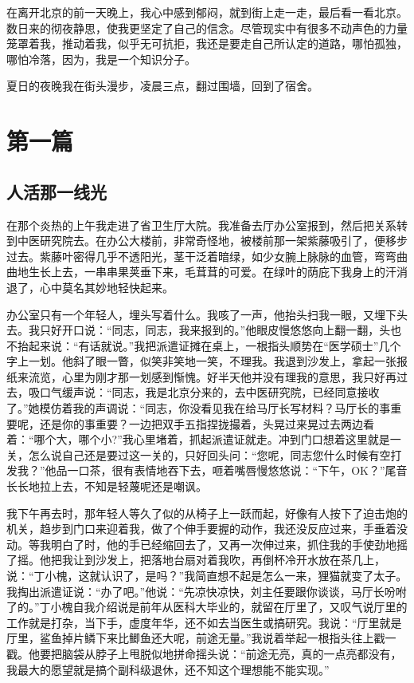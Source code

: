 \documentclass[12pt,oneside]{book}
\begin{document}
在离开北京的前一天晚上，我心中感到郁闷，就到街上走一走，最后看一看北京。数日来的彻夜静思，使我更坚定了自己的信念。尽管现实中有很多不动声色的力量笼罩着我，推动着我，似乎无可抗拒，我还是要走自己所认定的道路，哪怕孤独，哪怕冷落，因为，我是一个知识分子。

夏日的夜晚我在街头漫步，凌晨三点，翻过围墙，回到了宿舍。

\part{第一篇}
\chapter{人活那一线光}
在那个炎热的上午我走进了省卫生厅大院。我准备去厅办公室报到，然后把关系转到中医研究院去。在办公大楼前，非常奇怪地，被楼前那一架紫藤吸引了，便移步过去。紫藤叶密得几乎不透阳光，茎干泛着暗绿，如少女腕上脉脉的血管，弯弯曲曲地生长上去，一串串果荚垂下来，毛茸茸的可爱。在绿叶的荫庇下我身上的汗消退了，心中莫名其妙地轻快起来。

办公室只有一个年轻人，埋头写着什么。我咳了一声，他抬头扫我一眼，又埋下头去。我只好开口说：``同志，同志，我来报到的。''他眼皮慢悠悠向上翻一翻，头也不抬起来说：``有话就说。''我把派遣证摊在桌上，一根指头顺势在``医学硕士''几个字上一划。他斜了眼一瞥，似笑非笑地一笑，不理我。我退到沙发上，拿起一张报纸来流览，心里为刚才那一划感到惭愧。好半天他并没有理我的意思，我只好再过去，吸口气缓声说：``同志，我是北京分来的，去中医研究院，已经同意接收了。''她模仿着我的声调说：``同志，你没看见我在给马厅长写材料？马厅长的事重要呢，还是你的事重要？一边把双手五指捏拢撮着，头晃过来晃过去两边看着：``哪个大，哪个小?''我心里堵着，抓起派遣证就走。冲到门口想着这里就是一关，怎么说自己还是要过这一关的，只好回头问：``您呢，同志您什么时候有空打发我？''他品一口茶，很有表情地吞下去，咂着嘴唇慢悠悠说：``下午，OK？''尾音长长地拉上去，不知是轻蔑呢还是嘲讽。

我下午再去时，那年轻人等久了似的从椅子上一跃而起，好像有人按下了迫击炮的机关，趋步到门口来迎着我，做了个伸手要握的动作，我还没反应过来，手垂着没动。等我明白了时，他的手已经缩回去了，又再一次伸过来，抓住我的手使劲地摇了摇。他把我让到沙发上，把落地台扇对着我吹，再倒杯冷开水放在茶几上，说：``丁小槐，这就认识了，是吗？''我简直想不起是怎么一来，狸猫就变了太子。我掏出派遣证说：``办了吧。''他说：``先凉快凉快，刘主任要跟你谈谈，马厅长吩咐了的。''丁小槐自我介绍说是前年从医科大毕业的，就留在厅里了，又叹气说厅里的工作就是打杂，当下手，虚度年华，还不如去当医生或搞研究。我说：``厅里就是厅里，鲨鱼掉片鳞下来比鲫鱼还大呢，前途无量。''我说着举起一根指头往上戳一戳。他要把脑袋从脖子上甩脱似地拼命摇头说：``前途无亮，真的一点亮都没有，我最大的愿望就是搞个副科级退休，还不知这个理想能不能实现。''
\end{document}

